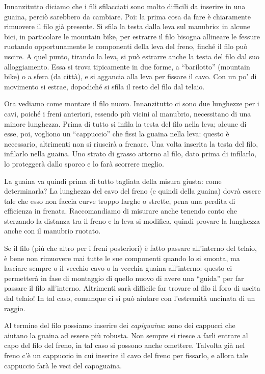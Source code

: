 Innanzitutto diciamo che i fili sfilacciati sono molto difficili da inserire in una guaina, perciò sarebbero da cambiare.
Poi: la prima cosa da fare è chiaramente rimuovere il filo già presente.
Si sfila la testa dalla leva sul manubrio: in alcune bici, in particolare le mountain bike, per estrarre il filo bisogna allineare le fessure ruotando opportunamente le componenti della leva del freno, finché il filo può uscire.
A quel punto, tirando la leva, si può estrarre anche la testa del filo dal suo alloggiamento.
Essa si trova tipicamente in due forme, a ``barilotto'' (mountain bike) o a sfera (da città), e si aggancia alla leva per fissare il cavo.
Con un po' di movimento si estrae, dopodiché si sfila il resto del filo dal telaio.

Ora vediamo come montare il filo nuovo.
Innanzitutto ci sono due lunghezze per i cavi, poiché i freni anteriori, essendo più vicini al manubrio, necessitano di una minore lunghezza.
Prima di tutto si infila la testa del filo nella leva; alcune di esse, poi, vogliono un ``cappuccio'' che fissi la guaina nella leva: questo è necessario, altrimenti non si riuscirà a frenare.
Una volta inserita la testa del filo, infilarlo nella guaina.
Uno strato di grasso attorno al filo, dato prima di infilarlo, lo proteggerà dallo sporco e lo farà scorrere meglio.

La guaina va quindi prima di tutto tagliata della misura giusta: come determinarla?
La lunghezza del cavo del freno (e quindi della guaina) dovrà essere tale che esso non faccia curve troppo larghe o strette, pena una perdita di efficienza in frenata.
Raccomandiamo di misurare anche tenendo conto che sterzando la distanza tra il freno e la leva si modifica, quindi provare la lunghezza anche con il manubrio ruotato.

Se il filo (più che altro per i freni posteriori) è fatto passare all'interno del telaio, è bene non rimuovere mai tutte le sue componenti quando lo si smonta, ma lasciare sempre o il vecchio cavo o la vecchia guaina all'interno: questo ci permetterà in fase di montaggio di quello nuovo di avere una ``guida'' per far passare il filo all'interno.
Altrimenti sarà difficile far trovare al filo il foro di uscita dal telaio!
In tal caso, comunque ci si può aiutare con l'estremità uncinata di un raggio.

Al termine del filo possiamo inserire dei \emph{capiguaina}: sono dei cappucci che aiutano la guaina ad essere più robusta.
Non sempre si riesce a farli entrare al capo del filo del freno, in tal caso si possono anche omettere.
Talvolta già nel freno c'è un cappuccio in cui inserire il cavo del freno per fissarlo, e allora tale cappuccio farà le veci del capoguaina.

